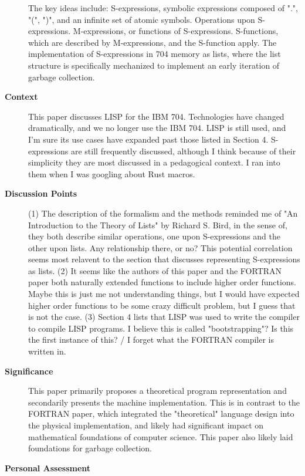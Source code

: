 \begin{description}
        The key ideas include: S-expressions, symbolic expressions composed of ".", "(", ")", and an infinite set of atomic symbols.
        Operations upon S-expressions.
        M-expressions, or functions of S-expressions.
        S-functions, which are described by M-expressions, and the S-function apply.
        The implementation of S-expressions in 704 memory as lists, where the list structure is specifically mechanized to implement an early iteration of garbage collection.
    \item[\textbf{Context}]
        This paper discusses LISP for the IBM 704.
        Technologies have changed dramatically, and we no longer use the IBM 704.
        LISP is still used, and I'm sure its use cases have expanded past those listed in Section 4.
        S-expressions are still frequently discussed, although I think because of their simplicity they are most discussed in a pedagogical context.
        I ran into them when I was googling about Rust macros.
    \item[\textbf{Discussion Points}]
        (1) The description of the formalism and the methods reminded me of "An Introduction to the Theory of Lists" by Richard S. Bird, in the sense of, they both describe similar operations, one upon S-expressions and the other upon lists.
        Any relationship there, or no?
        This potential correlation seems most relavent to the section that discusses representing S-expressions as lists.
        (2) It seems like the authors of this paper and the FORTRAN paper both naturally extended functions to include higher order functions.
        Maybe this is just me not understanding things, but I would have expected higher order functions to be some crazy difficult problem, but I guess that is not the case.
        (3) Section 4 lists that LISP was used to write the compiler to compile LISP programs.
        I believe this is called "bootstrapping"?
        Is this the first instance of this? / I forget what the FORTRAN compiler is written in.
    \item[\textbf{Significance}]
        This paper primarily proposes a theoretical program representation and secondarily presents the machine implementation.
        This is in contrast to the FORTRAN paper, which integrated the "theoretical" language design into the physical implementation, and likely had significant impact on mathematical foundations of computer science.
        This paper also likely laid foundations for garbage collection.
    \item[\textbf{Personal Assessment}]
\end{description}

